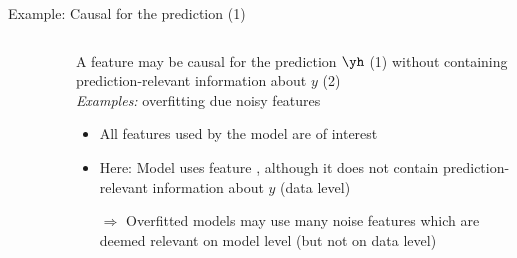 \documentclass[11pt,compress,t,notes=noshow, aspectratio=169, xcolor=table]{beamer}
\begin{document}
\begin{frame}[c]{Example: Causal for the prediction (1)}
\begin{columns}[c]
\begin{column}{0.5\textwidth}
\begin{figure}
\end{figure} 
  \end{column}
  \begin{column}{0.5\textwidth}
  A feature may be causal for the prediction $\yh$ (1) without containing prediction-relevant information about $y$ (2)\\ 
  \textit{Examples:} overfitting due noisy features
  \lz\pause
    \begin{itemize}
      \item All features used by the model are of interest
      \item Here: Model uses feature , although it does not contain prediction-relevant information about $y$ (data level)
      \item[$\Rightarrow$] Overfitted models may use many noise features which are deemed relevant on model level (but not on data level)
  \end{itemize}
  \end{column}
\end{columns}

\end{frame}
\end{document}

